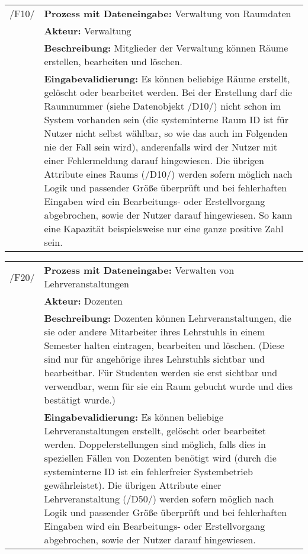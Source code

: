 \begin{tabular}{p{1.5cm}p{14.5cm}}
		
	 /F10/	& \textbf{Prozess mit Dateneingabe:} Verwaltung von Raumdaten \\
				& \textbf{Akteur:} Verwaltung \\
				& \textbf{Beschreibung:} Mitglieder der Verwaltung können Räume erstellen, bearbeiten und löschen. \\
				& \textbf{Eingabevalidierung:} Es können beliebige Räume erstellt, gelöscht oder bearbeitet werden. Bei der Erstellung darf die Raumnummer (siehe Datenobjekt /D10/) nicht schon im System vorhanden sein (die systeminterne Raum ID ist für Nutzer nicht selbst wählbar, so wie das auch im Folgenden nie der Fall sein wird), anderenfalls wird der Nutzer mit einer Fehlermeldung darauf hingewiesen. Die übrigen Attribute eines Raums (/D10/) werden sofern möglich nach Logik und passender Größe überprüft und bei fehlerhaften Eingaben wird ein Bearbeitungs- oder Erstellvorgang abgebrochen, sowie der Nutzer darauf hingewiesen. So kann eine Kapazität beispielsweise nur eine ganze positive Zahl sein. \\[0.25cm]

\end{tabular}


\begin{tabular}{p{1.5cm}p{14.5cm}}
		
	 /F20/	& \textbf{Prozess mit Dateneingabe:} Verwalten von Lehrveranstaltungen \\
				& \textbf{Akteur:} Dozenten \\
				& \textbf{Beschreibung:} Dozenten können Lehrveranstaltungen, die sie oder andere Mitarbeiter ihres Lehrstuhls in einem Semester halten eintragen, bearbeiten und löschen. (Diese sind nur für angehörige ihres Lehrstuhls sichtbar und bearbeitbar. Für Studenten werden sie erst sichtbar und verwendbar, wenn für sie ein Raum gebucht wurde und dies bestätigt wurde.) \\
				& \textbf{Eingabevalidierung:} Es können beliebige Lehrveranstaltungen erstellt, gelöscht oder bearbeitet werden. Doppelerstellungen sind möglich, falls dies in speziellen Fällen von Dozenten benötigt wird (durch die systeminterne ID ist ein fehlerfreier Systembetrieb gewährleistet). Die übrigen Attribute einer Lehrveranstaltung (/D50/) werden sofern möglich nach Logik und passender Größe überprüft und bei fehlerhaften Eingaben wird ein Bearbeitungs- oder Erstellvorgang abgebrochen, sowie der Nutzer darauf hingewiesen.\\[0.25cm]

\end{tabular}


